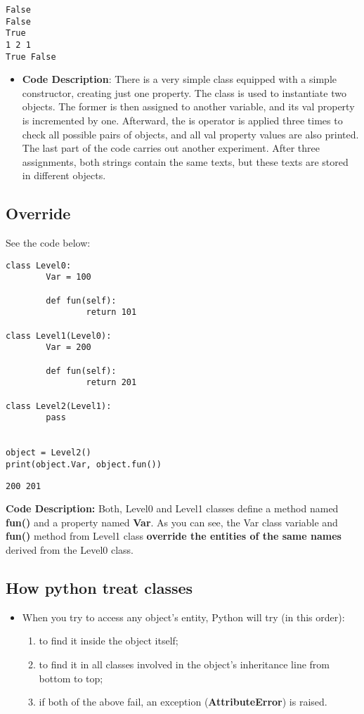 \documentclass[11pt]{article}
\begin{document}
\begin{verbatim}
False
False
True
1 2 1
True False
\end{verbatim}

\begin{itemize}
\item \textbf{Code Description}: There is a very simple class equipped with a
simple constructor, creating just one property. The class is used to
instantiate two objects. The former is then assigned to another
variable, and its val property is incremented by one.  Afterward,
the is operator is applied three times to check all possible pairs
of objects, and all val property values are also printed. The last
part of the code carries out another experiment. After three
assignments, both strings contain the same texts, but these texts
are stored in different objects.
\end{itemize}
\subsection{Override}
\label{sec:org474b17f}

See the code below:

\begin{verbatim}
class Level0:
        Var = 100

        def fun(self):
                return 101

class Level1(Level0):
        Var = 200

        def fun(self):
                return 201

class Level2(Level1):
        pass


object = Level2()
print(object.Var, object.fun())

\end{verbatim}

\begin{verbatim}
200 201
\end{verbatim}

\textbf{Code Description:} Both, Level0 and Level1 classes define a method
 named \textbf{fun()} and a property named \textbf{Var}. As you can see, the Var
 class variable and \textbf{fun()} method from Level1 class \textbf{override the
 entities of the same names} derived from the Level0 class.

\subsection{How python treat classes}
\label{sec:orgc1480a1}
\begin{itemize}
\item When you try to access any object’s entity, Python will try (in this
order):

\begin{enumerate}
\item to find it inside the object itself;
\item to find it in all classes involved in the object’s inheritance
line from bottom to top;
\item if both of the above fail, an exception (\textbf{AttributeError}) is
raised.
\end{enumerate}
\end{itemize}
\end{document}
